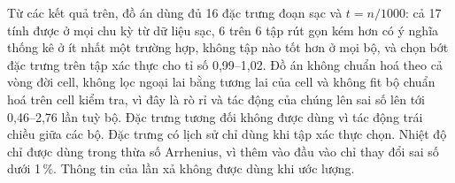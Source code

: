 Từ các kết quả trên, đồ án dùng đủ 16 đặc trưng đoạn sạc và $t = n/1000$: cả 17 tính được ở mọi chu kỳ từ dữ liệu sạc, 6 trên 6 tập rút gọn kém hơn có ý nghĩa thống kê ở ít nhất một trường hợp, không tập nào tốt hơn ở mọi bộ, và chọn bớt đặc trưng trên tập xác thực cho tỉ số 0{,}99--1{,}02. Đồ án không chuẩn hoá theo cả vòng đời cell, không lọc ngoại lai bằng tương lai của cell và không fit bộ chuẩn hoá trên cell kiểm tra, vì đây là rò rỉ và tác động của chúng lên sai số lên tới 0{,}46--2{,}76 lần tuỳ bộ. Đặc trưng tương đối không được dùng vì tác động trái chiều giữa các bộ. Đặc trưng có lịch sử chỉ dùng khi tập xác thực chọn. Nhiệt độ chỉ được dùng trong thừa số Arrhenius, vì thêm vào đầu vào chỉ thay đổi sai số dưới 1\,\%. Thông tin của lần xả không được dùng khi ước lượng.
